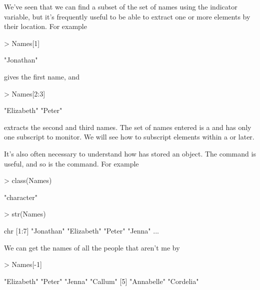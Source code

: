 We've seen that we can find a subset of the set of names using the indicator variable, but it's frequently useful to be able to extract one or more elements by their location. For example 

\begin{Schunk}
\begin{Sinput}
> Names[1] 
\end{Sinput}
\begin{Soutput}
[1] "Jonathan"
\end{Soutput}
\end{Schunk}

gives the first name, and  

\begin{Schunk}
\begin{Sinput}
> Names[2:3] 
\end{Sinput}
\begin{Soutput}
[1] "Elizabeth" "Peter"    
\end{Soutput}
\end{Schunk}

extracts the second and third names. The set of names entered is a  and has only one subscript to monitor. We will see how to subscript elements within a  or  later. 
 
It's also often necessary to understand how \R{} has stored an object. The  command is useful, and so is the  command. For example 

\begin{Schunk}
\begin{Sinput}
> class(Names) 
\end{Sinput}
\begin{Soutput}
[1] "character"
\end{Soutput}
\begin{Sinput}
> str(Names) 
\end{Sinput}
\begin{Soutput}
 chr [1:7] "Jonathan" "Elizabeth" "Peter" "Jenna" ...
\end{Soutput}
\end{Schunk}

We can get the names of all the people that aren't me by 

\begin{Schunk}
\begin{Sinput}
> Names[-1] 
\end{Sinput}
\begin{Soutput}
[1] "Elizabeth" "Peter"     "Jenna"     "Callum"   
[5] "Annabelle" "Cordelia" 
\end{Soutput}
\end{Schunk}

